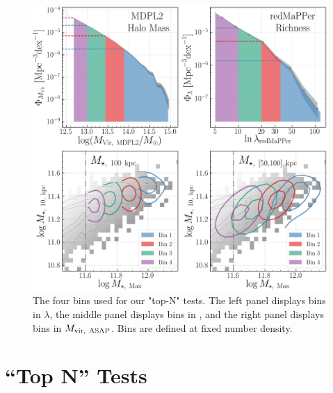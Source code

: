 \documentclass[a4paper,fleqn,usenatbib]{mnras}
\begin{document}
  \begin{figure}
      \centering 
      \includegraphics[width=\textwidth]{figure/topn_bins}
      \caption{The four bins used for our "top-N" tests. The left panel displays bins in
          $\lambda$, the middle panel displays bins in \mmax{}, and the right panel displays bins
          in $M_{\rm vir,\ ASAP}$. Bins are defined at fixed number density. }
      \label{fig:density_bins}
  \end{figure}

\section{``Top N'' Tests}
    \label{sec:topn_intro}   
\end{document}

